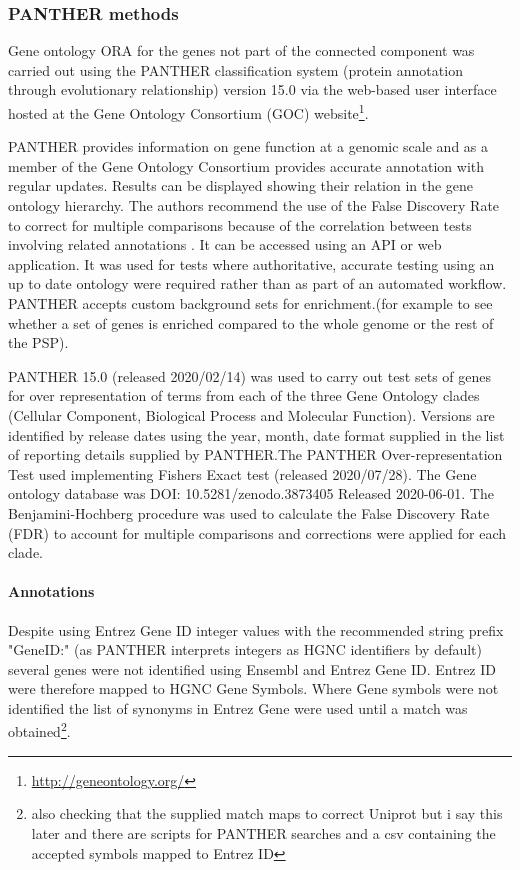 \subsubsection{PANTHER methods}
\label{sec:panther methods1}
Gene ontology ORA for the genes not part of the connected component was carried out using the PANTHER classification system (protein annotation through evolutionary relationship) version 15.0\cite{mi2019protocol} via the web-based user interface hosted at the Gene Ontology Consortium (GOC) website\footnote{\url{http://geneontology.org/}}.

PANTHER provides information on gene function at a genomic scale and as a member of the Gene Ontology Consortium provides accurate annotation with regular updates. Results can be displayed showing their relation in the gene ontology hierarchy\cite{mi2019protocol}.  The authors recommend the use of the False Discovery Rate to correct for multiple comparisons because of the correlation between tests involving related annotations \cite{mi2019protocol}. It can be accessed using an API or web application. It was used for tests where authoritative, accurate testing using an up to date ontology were required rather than as part of an automated workflow. PANTHER accepts custom background sets for enrichment.(for example to see whether a set of genes is enriched compared to the whole genome or the rest of the PSP). 

PANTHER 15.0 (released 2020/02/14)\cite{mi2013large} was used to carry out test sets of genes for over representation of terms from each of the three Gene Ontology clades (Cellular Component, Biological Process and Molecular Function).  Versions are identified by release dates using the year, month, date format supplied in the list of reporting details supplied by PANTHER.The PANTHER Over-representation Test used implementing Fishers Exact test (released 2020/07/28).  The Gene ontology database was DOI: 10.5281/zenodo.3873405 Released 2020-06-01.  The Benjamini-Hochberg procedure \cite{benjamini1995controlling} was used to calculate the False Discovery Rate (FDR) to account for multiple comparisons and corrections  were applied for each clade.

\paragraph{Annotations}

Despite using Entrez Gene ID integer values with the recommended string prefix "GeneID:" (as PANTHER interprets integers as HGNC identifiers by default) several genes were not identified using Ensembl and Entrez Gene ID. Entrez ID were therefore mapped to HGNC Gene Symbols. Where Gene symbols were not identified the list of synonyms in Entrez Gene were used until a match was obtained\footnote{also checking that the supplied match maps to correct Uniprot but i say this later and there are scripts for PANTHER searches and a csv containing the accepted symbols mapped to Entrez ID}. 




